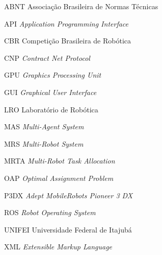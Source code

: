 \renewcommand{\nomname}{\listadesiglasname}
\pdfbookmark[0]{\nomname}{las}
\cleardoublepage
\begin{siglas}
    \item[ABNT] Associação Brasileira de Normas Técnicas
    \item[API] \textit{Application Programming Interface}
    \item[CBR] Competição Brasileira de Robótica
    \item[CNP] \textit{Contract Net Protocol}
    \item[GPU] \textit{Graphics Processing Unit}
    \item[GUI] \textit{Graphical User Interface}
    \item[LRO] Laboratório de Robótica
    \item[MAS] \textit{Multi-Agent System}
    \item[MRS] \textit{Multi-Robot System}
    \item[MRTA] \textit{Multi-Robot Task Allocation}
    \item[OAP] \textit{Optimal Assignment Problem}
    \item[P3DX] \textit{Adept MobileRobots Pioneer 3 DX}
    \item[ROS] \textit{Robot Operating System}
    \item[UNIFEI] Universidade Federal de Itajubá
    \item[XML] \textit{Extensible Markup Language}
\end{siglas}